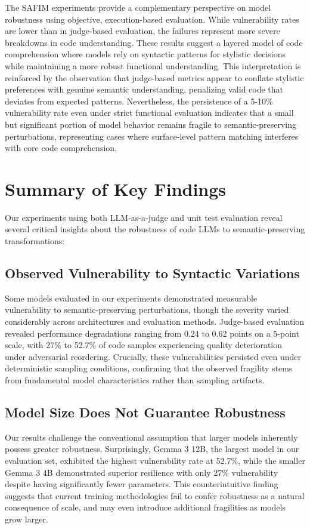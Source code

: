 \documentclass[%
thesis=student,%
coverpage=false,%
titlepage=false,%
headmarks=true, %
english,%
font=libertine, %
math=newpxtx, %
BCOR=5mm,%
coverBCOR=11mm%
]{tum-templates/book/tumbook}
\begin{document}
The SAFIM experiments provide a complementary perspective on model robustness using objective, execution-based evaluation. While vulnerability rates are lower than in judge-based evaluation, the failures represent more severe breakdowns in code understanding. These results suggest a layered model of code comprehension where models rely on syntactic patterns for stylistic decisions while maintaining a more robust functional understanding. This interpretation is reinforced by the observation that judge-based metrics appear to conflate stylistic preferences with genuine semantic understanding, penalizing valid code that deviates from expected patterns. Nevertheless, the persistence of a 5-10\% vulnerability rate even under strict functional evaluation indicates that a small but significant portion of model behavior remains fragile to semantic-preserving perturbations, representing cases where surface-level pattern matching interferes with core code comprehension.

\section{Summary of Key Findings}

Our experiments using both LLM-as-a-judge and unit test evaluation reveal several critical insights about the robustness of code LLMs to semantic-preserving transformations:

\subsection{Observed Vulnerability to Syntactic Variations}
Some models evaluated in our experiments demonstrated measurable vulnerability to semantic-preserving perturbations, though the severity varied considerably across architectures and evaluation methods. Judge-based evaluation revealed performance degradations ranging from 0.24 to 0.62 points on a 5-point scale, with 27\% to 52.7\% of code samples experiencing quality deterioration under adversarial reordering. Crucially, these vulnerabilities persisted even under deterministic sampling conditions, confirming that the observed fragility stems from fundamental model characteristics rather than sampling artifacts.

\subsection{Model Size Does Not Guarantee Robustness}
Our results challenge the conventional assumption that larger models inherently possess greater robustness. Surprisingly, Gemma 3 12B, the largest model in our evaluation set, exhibited the highest vulnerability rate at 52.7\%, while the smaller Gemma 3 4B demonstrated superior resilience with only 27\% vulnerability despite having significantly fewer parameters. This counterintuitive finding suggests that current training methodologies fail to confer robustness as a natural consequence of scale, and may even introduce additional fragilities as models grow larger.
\end{document}
